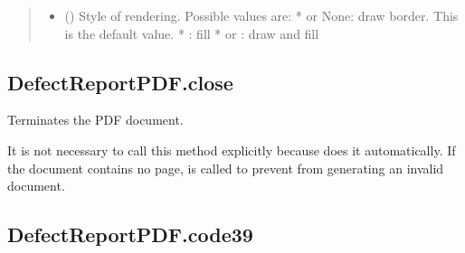 \documentclass[letterpaper,10pt,english]{sphinxmanual}
\begin{document}
\begin{fulllineitems}
\begin{fulllineitems}
\begin{quote}
\begin{description}
\begin{itemize}
\item {} 
\sphinxAtStartPar
{} () \textendash{} Style of rendering. Possible values are:
*  or None: draw border. This is the default value.
* : fill
*  or : draw and fill

\end{itemize}

\end{description}\end{quote}

\end{fulllineitems}



\subsection{DefectReportPDF.close}
\label{\detokenize{generated/quality_assessment.quality_pdf_report.DefectReportPDF.close:defectreportpdf-close}}\label{\detokenize{generated/quality_assessment.quality_pdf_report.DefectReportPDF.close::doc}}

\begin{fulllineitems}
\label{\detokenize{generated/quality_assessment.quality_pdf_report.DefectReportPDF.close:quality_assessment.quality_pdf_report.DefectReportPDF.close}}
\sphinxAtStartPar
Terminates the PDF document.

\sphinxAtStartPar
It is not necessary to call this method explicitly because  does it automatically.
If the document contains no page,  is called to prevent from generating an invalid document.

\end{fulllineitems}



\subsection{DefectReportPDF.code39}
\label{\detokenize{generated/quality_assessment.quality_pdf_report.DefectReportPDF.code39:defectreportpdf-code39}}\label{\detokenize{generated/quality_assessment.quality_pdf_report.DefectReportPDF.code39::doc}}


\end{fulllineitems}
\end{document}
